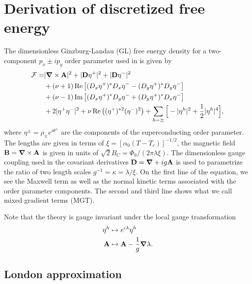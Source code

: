 \section{Derivation of discretized free energy}

The dimensionless Ginzburg-Landau (GL) free energy density for a two-component $p_x\pm ip_y$ order parameter used in \cite{AsleGaraud16} is given by
\begin{equation}
  \begin{split}
	\mathcal{F} = &|{\boldsymbol{\mathbf{\nabla}}}\times{\ensuremath{\boldsymbol{\mathbf{A}}}}|^2 + |{\boldsymbol{\mathbf{D}}}\eta^+|^2 + |{\boldsymbol{\mathbf{D}}}\eta^-|^2\\
	&+ (\nu+1)\operatorname{Re}\big[(D_x\eta^+)^\ast D_x\eta^- - (D_y\eta^+)^\ast D_y\eta^-\big]\\
	& + (\nu-1)\operatorname{Im}\big[(D_x\eta^+)^\ast D_y\eta^- + (D_y\eta^+)^\ast D_x\eta^-\big]\\
	&+ 2|\eta^+\eta^-|^2 + \nu\operatorname{Re}\big( (\eta^+)^{\ast 2}(\eta^-)^2 \big) + \sum_{h=\pm}\Big[-|\eta^h|^2 + \frac{1}{2}|\eta^h|^4\Big],
  \end{split}
  \label{eq:disc:FreeEn:initial}
\end{equation}
where $\eta^\pm=\rho_\pm e^{i\theta^\pm}$ are the components of the superconducting order parameter. The lengths are given in terms of $\xi = [\alpha_0(T-T_c)]^{-1/2}$,
the magnetic field ${\boldsymbol{\mathbf{B}}} = {\boldsymbol{\mathbf{\nabla}}}\times{\ensuremath{\boldsymbol{\mathbf{A}}}}$ is given in units of $\sqrt{2}B_C = \Phi_0/(2\pi\lambda\xi)$. The dimensionless gauge
coupling used in the covariant derivatives ${\boldsymbol{\mathbf{D}}} = {\boldsymbol{\mathbf{\nabla}}} + ig{\boldsymbol{\mathbf{A}}}$ is used to parametrize the ratio of two length scales 
$g^{-1} = \kappa = \lambda/\xi$. On the first line of the equation, we see the Maxwell term as well as the normal kinetic terms associated with the order parameter components. The second
and third line shows what we call mixed gradient terms (MGT).

Note that the theory is gauge invariant under the local gauge transformation
\begin{subequations}
  \begin{align}
	\eta^h &\mapsto e^{i\lambda}\eta^h \label{eq:disc:Gauge:continuous:eta}\\
	{\boldsymbol{\mathbf{A}}} &\mapsto {\ensuremath{\boldsymbol{\mathbf{A}}}} - \frac{1}{g}{\boldsymbol{\mathbf{\nabla}}}\lambda.
	\label{eq:disc:Gauge:continuous:A}
  \end{align}
  \label{eq:Gauge:continuous}
\end{subequations}

\subsection{London approximation}


